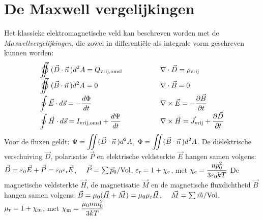 \documentclass[twoside]{report}
\begin{document}
\section{De Maxwell vergelijkingen}
Het klassieke elektromagnetische veld kan beschreven worden met de
{\it Maxwellvergelijkingen}, die zowel in differenti\"ele als integrale vorm
geschreven kunnen worden:
\[
\begin{array}{ll}
\displaystyle\oiint(\vec{D}\cdot\vvec{n})d^2A=Q_{\rm vrij,omsl}~~~~~~~~~~~~~
 &\displaystyle\nabla\cdot\vec{D}=\rho_{\rm vrij}\\
\displaystyle\oiint(\vec{B}\cdot\vvec{n})d^2A=0
 &\displaystyle\nabla\cdot\vec{B}=0\\
\displaystyle\oint\vec{E}\cdot d\vec{s}=-\frac{d\Phi}{dt}
 &\displaystyle\nabla\times\vec{E}=-\Q{\vec{B}}{t}\\
\displaystyle\oint\vec{H}\cdot d\vec{s}=I_{\rm vrij,omsl}+\frac{d\Psi}{dt}
 &\displaystyle\nabla\times\vec{H}=\vec{J}_{\rm vrij}+\Q{\vec{D}}{t}
\end{array}
\]
Voor de fluxen geldt: $\displaystyle \Psi=\int\hspace{-1.5ex}\int(\vec{D}\cdot\vec{n}\,)d^2A$,
$\displaystyle\Phi=\int\hspace{-1.5ex}\int(\vec{B}\cdot\vec{n}\,)d^2A$.
\npar
De di\"elektrische verschuiving $\vec{D}$, polarisatie $\vec{P}$ en
elektrische veldsterkte $\vec{E}$ hangen samen volgens:
\npar
$\vec{D}=\varepsilon_0\vec{E}+\vec{P}=\varepsilon_0\varepsilon_{\rm r}\vec{E}$,~~
$\vec{P}=\sum\vec{p}_0/{\rm Vol}$, $\varepsilon_{\rm r}=1+\chi_{\rm e}$, met
$\displaystyle\chi_{\rm e}=\frac{np_0^2}{3\varepsilon_0kT}$
\npar
De magnetische veldsterkte $\vec{H}$, de magnetisatie $\vec{M}$ en de
magnetische fluxdichtheid $\vec{B}$ hangen samen volgens:
\npar
$\vec{B}=\mu_0(\vec{H}+\vec{M})=\mu_0\mu_{\rm r}\vec{H}$,~~
$\vec{M}=\sum\vec{m}/{\rm Vol}$, $\mu_{\rm r}=1+\chi_{\rm m}$, met
$\displaystyle\chi_{\rm m}=\frac{\mu_0nm_0^2}{3kT}$
\end{document}
